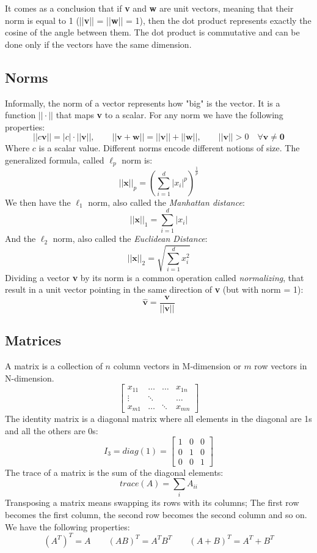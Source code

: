 \documentclass[
	11pt, %
	fleqn, %
	a4paper, %
]{LegrandOrangeBook}
\begin{document}
It comes as a conclusion that if \textbf{v} and \textbf{w} are unit vectors, meaning that their norm is equal to 1 (||\textbf{v}|| = ||\textbf{w}|| = 1), then the dot product represents exactly the cosine of the angle between them. The dot product is commutative and can be done only if the vectors have the same dimension.

\subsection{Norms}
Informally, the norm of a vector represents how "big" is the vector. It is a function $||\cdot||$ that maps \textbf{v} to a scalar. For any norm we have the following properties:
$$||c\textbf{v}|| = |c| \cdot ||\textbf{v}||, \qquad ||\textbf{v} + \textbf{w}|| = ||\textbf{v}|| + || \textbf{w}||, \qquad ||\textbf{v}|| > 0 \quad \forall \textbf{v} \neq \textbf{0}$$
Where $c$ is a scalar value. Different norms encode different notions of size. The generalized formula, called $\ell_p$ norm is:
$$||\textbf{x}||_p = (\sum_{i = 1}^{d}|x_i|^p)^{\frac{1}{p}}$$
We then have the $\ell_1$ norm, also called the \emph{Manhattan distance}:
$$ ||\textbf{x}||_1 = \sum_{i=1}^{d}|x_i|$$
And the $\ell_2$ norm, also called the \emph{Euclidean Distance}:
$$ ||\textbf{x}||_2 = \sqrt{\sum_{i=1}^{d}x_i^2}$$
Dividing a vector \textbf{v} by its norm is a common operation called \emph{normalizing}, that result in a unit vector pointing in the same direction of \textbf{v} (but with norm = 1):
$$\hat{\textbf{v}} = \frac{\textbf{v}}{||\textbf{v}||}$$
\subsection{Matrices}
A matrix is a collection of $n$ column vectors in M-dimension or $m$ row vectors in N-dimension.
$$
	\begin{bmatrix}
		x_{11} & \hdots & \hdots & x_{1n} \\
		\vdots & \ddots &        & \hdots \\
		x_{m1} & \hdots & \ddots & x_{mn}
	\end{bmatrix}
$$
The identity matrix is a diagonal matrix where all elements in the diagonal are 1s and all the others are 0s:
$$ I_3 = diag(1) =
	\begin{bmatrix}
		1 & 0 & 0 \\
		0 & 1 & 0 \\
		0 & 0 & 1
	\end{bmatrix}
$$
The trace of a matrix is the sum of the diagonal elements:
$$trace(A) = \sum_{i}A_{ii}$$
Transposing a matrix means swapping its rows with its columns; The first row becomes the first column, the second row becomes the second column and so on. We have the following properties:
$$(A^T)^T = A \qquad (AB)^T = A^T B^T \qquad (A + B)^T = A^T + B^T$$
\end{document}
